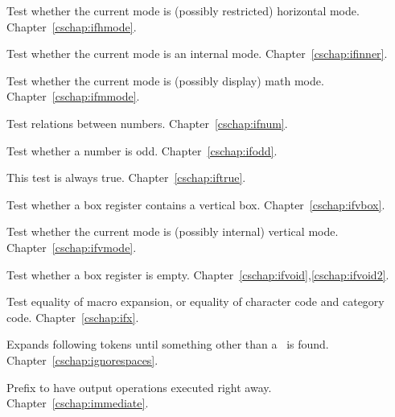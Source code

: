 \begin{glossinventory}
\item [\cs{ifhmode}]
      Test whether the current mode is (possibly restricted) horizontal mode.
Chapter~\ref{cschap:ifhmode}.

\item [\cs{ifinner}]
      Test whether the current mode is an internal mode.
Chapter~\ref{cschap:ifinner}.

\item [\cs{ifmmode}]
      Test whether the current mode is (possibly display) math mode.
Chapter~\ref{cschap:ifmmode}.

\item [\cs{ifnum\gr{number$_1$}\gr{relation}\gr{number$_2$}}]
      Test relations between numbers.
Chapter~\ref{cschap:ifnum}.

\item [\cs{ifodd\gr{number}}]
      Test whether a number is odd.
Chapter~\ref{cschap:ifodd}.

\item [\cs{iftrue}]
      This test is always true.
Chapter~\ref{cschap:iftrue}.

\item [\cs{ifvbox\gr{8-bit number}}]
      Test whether a box register contains a vertical box. 
Chapter~\ref{cschap:ifvbox}.

\item [\cs{ifvmode}]
      Test whether the current mode is (possibly internal) vertical mode.
Chapter~\ref{cschap:ifvmode}.

\item [\cs{ifvoid\gr{8-bit number}}]
      Test whether a box register is empty.
Chapter~\ref{cschap:ifvoid},\ref{cschap:ifvoid2}.

\item [\cs{ifx\gr{token$_1$}\gr{token$_2$}}]
      Test equality of macro expansion, or equality of character code and
      category code.
Chapter~\ref{cschap:ifx}.

\item [\cs{ignorespaces}]  
      Expands following tokens until something other
      than a~ is found.
Chapter~\ref{cschap:ignorespaces}.

\item [\cs{immediate}] 
      Prefix to have output operations executed right away.
Chapter~\ref{cschap:immediate}.


\end{glossinventory}
